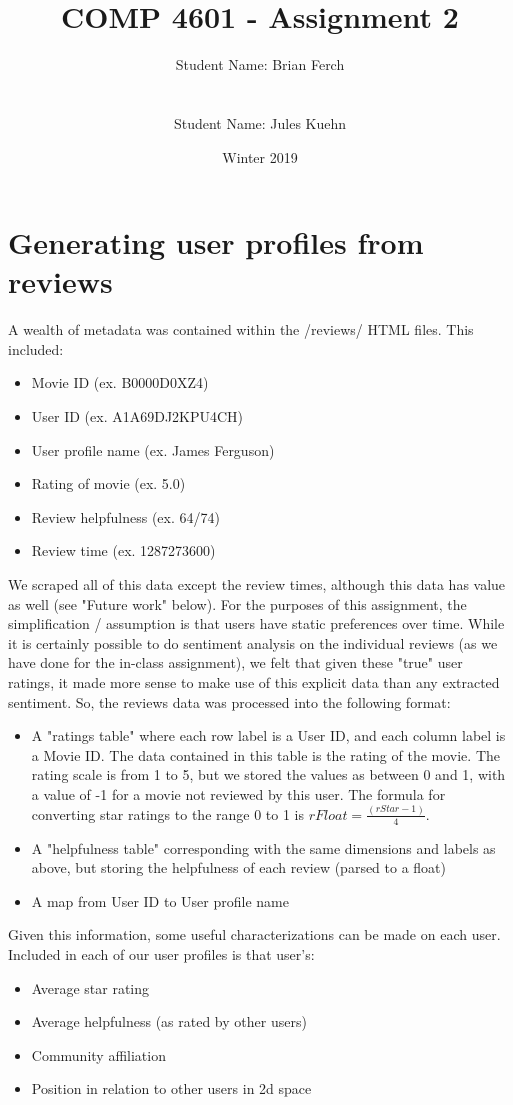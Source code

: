 \documentclass[11pt]{article}
\title{COMP 4601 - Assignment 2}
\author{Student Name: Brian Ferch\\
\text{Student Number: 100962115}\\\\ 
Student Name: Jules Kuehn\\
\text{Student Number: 100661464}}
\date{Winter 2019}
\begin{document}
\maketitle


\section{Generating user profiles from reviews}

A wealth of metadata was contained within the /reviews/ HTML files. This included:
\begin{itemize}
    \item Movie ID (ex. B0000D0XZ4)
    \item User ID (ex. A1A69DJ2KPU4CH)
    \item User profile name (ex. James Ferguson)
    \item Rating of movie (ex. 5.0)
    \item Review helpfulness (ex. 64/74)
    \item Review time (ex. 1287273600)
\end{itemize}
We scraped all of this data except the review times, although this data has value as well (see "Future work" below). For the purposes of this assignment, the simplification / assumption is that users have static preferences over time.
\newline
While it is certainly possible to do sentiment analysis on the individual reviews (as we have done for the in-class assignment), we felt that given these "true" user ratings, it made more sense to make use of this explicit data than any extracted sentiment. So, the reviews data was processed into the following format:
\begin{itemize}
    \item A "ratings table" where each row label is a User ID, and each column label is a Movie ID. The data contained in this table is the rating of the movie. The rating scale is from 1 to 5, but we stored the values as between 0 and 1, with a value of -1 for a movie not reviewed by this user. The formula for converting star ratings to the range 0 to 1 is $rFloat = \frac{(rStar-1)}{4}$.
    \item A "helpfulness table" corresponding with the same dimensions and labels as above, but storing the helpfulness of each review (parsed to a float)
    \item A map from User ID to User profile name
\end{itemize}
Given this information, some useful characterizations can be made on each user. Included in each of our user profiles is that user's:
\begin{itemize}
    \item Average star rating
    \item Average helpfulness (as rated by other users)
    \item Community affiliation
    \item Position in relation to other users in 2d space
\end{itemize}
\end{document}
